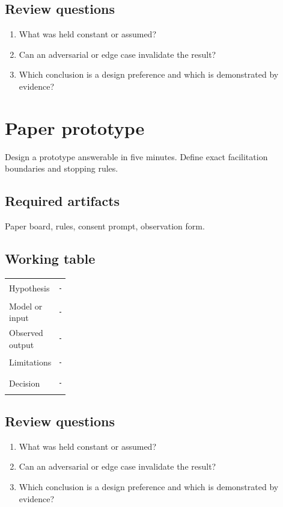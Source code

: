 \documentclass[11pt]{article}
\begin{document}
\subsection{Review questions}
\begin{enumerate}
\item What was held constant or assumed?
\item Can an adversarial or edge case invalidate the result?
\item Which conclusion is a design preference and which is demonstrated by evidence?
\end{enumerate}

\section{Paper prototype}
Design a prototype answerable in five minutes. Define exact facilitation boundaries and stopping rules.


\subsection{Required artifacts}
Paper board, rules, consent prompt, observation form.


\subsection{Working table}
\begin{tabularx}{\linewidth}{@{}p{0.20\linewidth}X@{}}\toprule
Hypothesis & \rule{0.90\linewidth}{0.4pt}\\[0.35cm]
Model or input & \rule{0.90\linewidth}{0.4pt}\\[0.35cm]
Observed output & \rule{0.90\linewidth}{0.4pt}\\[0.35cm]
Limitations & \rule{0.90\linewidth}{0.4pt}\\[0.35cm]
Decision & \rule{0.90\linewidth}{0.4pt}\\\bottomrule\end{tabularx}

\subsection{Review questions}
\begin{enumerate}
\item What was held constant or assumed?
\item Can an adversarial or edge case invalidate the result?
\item Which conclusion is a design preference and which is demonstrated by evidence?
\end{enumerate}
\end{document}
